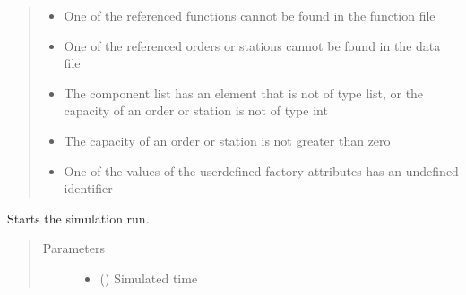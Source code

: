 \documentclass[letterpaper,10pt,english]{sphinxmanual}
\begin{document}
\begin{fulllineitems}
\begin{fulllineitems}
\begin{quote}
\begin{description}
\begin{itemize}
\item {} 
\sphinxAtStartPar
{} \textendash{} One of the referenced functions cannot be found in the function file

\item {} 
\sphinxAtStartPar
{} \textendash{} One of the referenced orders or stations cannot be found in the data file

\item {} 
\sphinxAtStartPar
{} \textendash{} The component list has an element that is not of type list, or the capacity of an order or
station is not of type int

\item {} 
\sphinxAtStartPar
{} \textendash{} The capacity of an order or station is not greater than zero

\item {} 
\sphinxAtStartPar
{} \textendash{} One of the values of the user\sphinxhyphen{}defined factory attributes has an undefined
identifier

\end{itemize}

\end{description}\end{quote}

\end{fulllineitems}


\begin{fulllineitems}
\label{\detokenize{source/API/api:environment.Environment.simulate}}
\sphinxAtStartPar
Starts the simulation run.
\begin{quote}\begin{description}
\item[{Parameters}] \leavevmode\begin{itemize}
\item {} 
\sphinxAtStartPar
{} () \textendash{} Simulated time


\end{itemize}
\end{description}
\end{quote}
\end{fulllineitems}
\end{fulllineitems}
\end{document}
